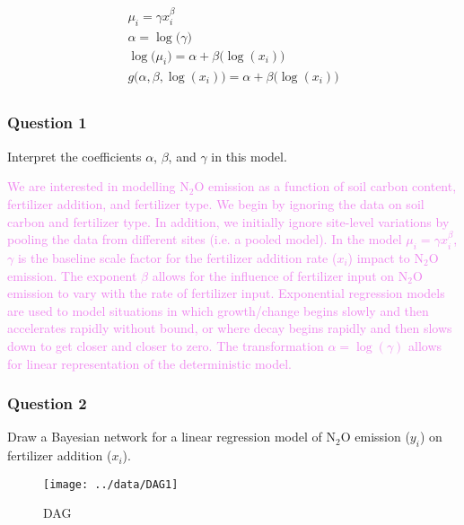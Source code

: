 \documentclass[
]{article}
\begin{document}
\[
\begin{aligned}
\mu_{i} = \gamma x_{i}^{\beta}\\
\alpha = \log \bigl(\gamma \bigr)\\
\log \bigl(\mu_{i} \bigr)  = \alpha+\beta \bigl(\log(x_i) \bigr)\\
g \bigl(\alpha,\beta,\log(x_i) \bigr)  = \alpha + \beta \bigl(\log(x_i) \bigr) \\
\end{aligned}
\]

\hypertarget{question-1}{%
\subsubsection{Question 1}\label{question-1}}

Interpret the coefficients \(\alpha\), \(\beta\), and \(\gamma\) in this
model.

\textcolor{violet}{We are interested in modelling $\textrm{N} _2 \textrm{O}$ emission as a function of soil carbon content, fertilizer addition, and fertilizer type. We begin by ignoring the data on soil carbon and fertilizer type. In addition, we initially ignore site-level variations by pooling the data from different sites (i.e. a pooled model). In the model $\mu_{i} = \gamma x_{i}^{\beta}$, $\gamma$ is the baseline scale factor for the fertilizer addition rate ($x_{i}$) impact to $\textrm{N} _2 \textrm{O}$ emission. The exponent $\beta$ allows for the influence of fertilizer input on $\textrm{N} _2 \textrm{O}$ emission to vary with the rate of fertilizer input. Exponential regression models are used to model situations in which growth/change begins slowly and then accelerates rapidly without bound, or where decay begins rapidly and then slows down to get closer and closer to zero. The transformation $\alpha = \log(\gamma)$ allows for linear representation of the deterministic model.}

\hypertarget{question-2}{%
\subsubsection{Question 2}\label{question-2}}

Draw a Bayesian network for a linear regression model of
\(\textrm{N} _2 \textrm{O}\) emission (\(y_{i}\)) on fertilizer addition
(\(x_{i}\)).

\begin{figure}
\texttt{[image: ../data/DAG1]} \caption{DAG}\label{fig:fig.a}
\end{figure}
\end{document}
